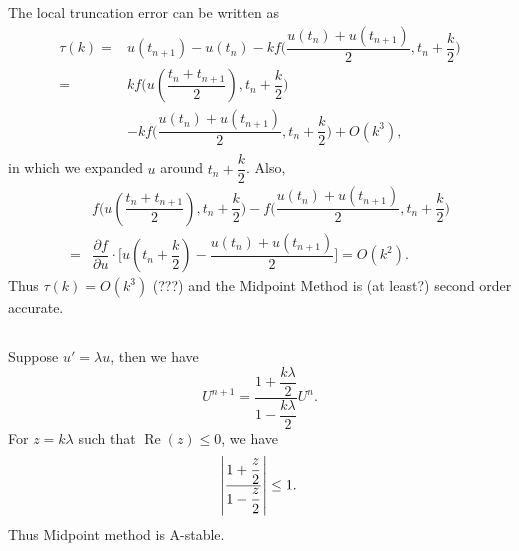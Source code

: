 \documentclass[11pt]{article}
\begin{document}
\subsection{}
The local truncation error can be written as
\begin{equation}\begin{split}
    \tau(k) =& u(t_{n+1})-u(t_n)-kf\Big(\dfrac{u(t_n)+u(t_{n+1})}2,t_n+\dfrac k2\Big)\\
            =& kf\Big(u(\dfrac{t_n+t_{n+1}}2),t_n+\dfrac k2\Big)\\
             & -kf\Big(\dfrac{u(t_n)+u(t_{n+1})}2,t_n+\dfrac k2\Big)+O(k^3),\\
\end{split}\end{equation}
in which we expanded $u$ around $t_n+\dfrac k2$. Also,
\begin{equation}\begin{split}
    &f\Big(u(\dfrac{t_n+t_{n+1}}2),t_n+\dfrac k2\Big) - 
        f\Big(\dfrac{u(t_n)+u(t_{n+1})}2,t_n+\dfrac k2\Big) \\
    =&\dfrac{\partial f}{\partial u}\cdot\Big[u(t_n+\dfrac k2) -
        \dfrac{u(t_n)+u(t_{n+1})}2\Big] = O(k^2).
\end{split}\end{equation}
Thus $\tau(k)=O(k^3)$ (???) and the Midpoint Method is (at least?) second order accurate.

\subsection{}
Suppose $u'=\lambda u$, then we have
\begin{equation}
    U^{n+1} = \dfrac{1+\dfrac{k\lambda}2}{1-\dfrac{k\lambda}2}U^n.
\end{equation}
For $z=k\lambda$ such that $\operatorname{Re}(z)\leq0$, we have 
\begin{equation}
    \abs{\dfrac{1+\dfrac z2}{1-\dfrac z2}} \leq 1.
\end{equation}
Thus Midpoint method is A-stable.
\end{document}
